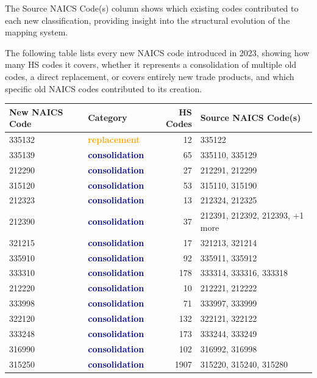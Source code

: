 \documentclass[11pt]{article}
\begin{document}
The Source NAICS Code(s) column shows which existing codes contributed to each new classification, providing insight into the structural evolution of the mapping system.

The following table lists every new NAICS code introduced in 2023, showing how many HS codes it covers, whether it represents a consolidation of multiple old codes, a direct replacement, or covers entirely new trade products, and which specific old NAICS codes contributed to its creation.

\begin{table}[H]
\centering
{}
\begin{tabular}{llrl}
\toprule
\textbf{New NAICS Code} & \textbf{Category} & \textbf{HS Codes} & \textbf{Source NAICS Code(s)} \\
\midrule
335132 & \textcolor{orange}{\textbf{replacement}} & 12 & 335122 \\
335139 & \textcolor{darkblue}{\textbf{consolidation}} & 65 & 335110, 335129 \\
212290 & \textcolor{darkblue}{\textbf{consolidation}} & 27 & 212291, 212299 \\
315120 & \textcolor{darkblue}{\textbf{consolidation}} & 53 & 315110, 315190 \\
212323 & \textcolor{darkblue}{\textbf{consolidation}} & 13 & 212324, 212325 \\
212390 & \textcolor{darkblue}{\textbf{consolidation}} & 37 & 212391, 212392, 212393, +1 more \\
321215 & \textcolor{darkblue}{\textbf{consolidation}} & 17 & 321213, 321214 \\
335910 & \textcolor{darkblue}{\textbf{consolidation}} & 92 & 335911, 335912 \\
333310 & \textcolor{darkblue}{\textbf{consolidation}} & 178 & 333314, 333316, 333318 \\
212220 & \textcolor{darkblue}{\textbf{consolidation}} & 10 & 212221, 212222 \\
333998 & \textcolor{darkblue}{\textbf{consolidation}} & 71 & 333997, 333999 \\
322120 & \textcolor{darkblue}{\textbf{consolidation}} & 132 & 322121, 322122 \\
333248 & \textcolor{darkblue}{\textbf{consolidation}} & 173 & 333244, 333249 \\
316990 & \textcolor{darkblue}{\textbf{consolidation}} & 102 & 316992, 316998 \\
315250 & \textcolor{darkblue}{\textbf{consolidation}} & 1907 & 315220, 315240, 315280 \\

\end{tabular}
\end{table}
\end{document}
